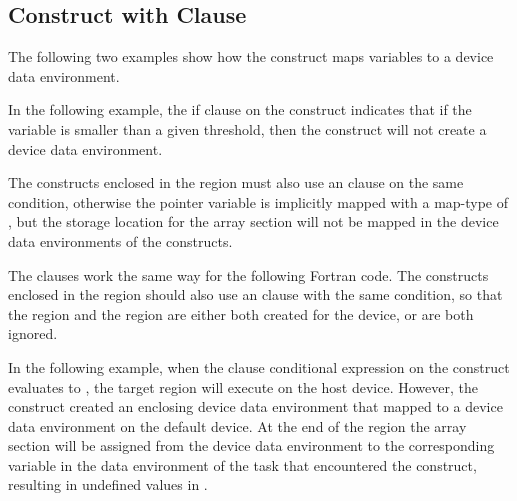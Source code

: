 
\subsection{  Construct with  Clause}
\label{subsec:target_data_if}

The following two examples show how the   construct 
maps variables to a device data environment.

In the following example, the if clause on the   construct 
indicates that if the variable  is smaller than a given threshold, then the  
 construct will not create a device data environment.

The  constructs enclosed in the   region 
must also use an  clause on the same condition, otherwise the pointer 
variable  is implicitly mapped with a map-type of , but the storage 
location for the array section  will not be mapped in the device data environments 
of the  constructs.


\pagebreak
The  clauses work the same way for the following Fortran code. The  
constructs enclosed in the   region should also use 
an  clause with the same condition, so that the   
region and the  region are either both created for the device, or 
are both ignored.


\pagebreak
In the following example, when the  clause conditional expression on 
the  construct evaluates to , the target region will 
execute on the host device. However, the   construct 
created an enclosing device data environment that mapped  to a device data 
environment on the default device. At the end of the   
region the array section  will be assigned from the device data environment 
to the corresponding variable in the data environment of the task that encountered 
the   construct, resulting in undefined values in .

